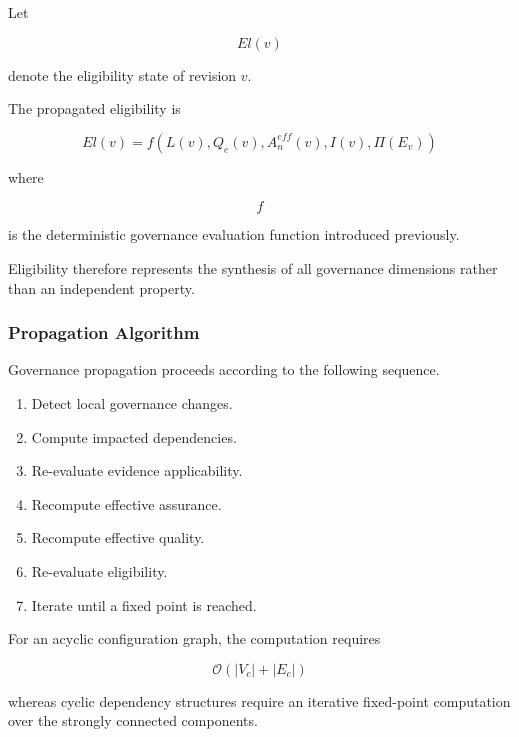 \documentclass[10pt]{article}
\begin{document}
Let

\[
El(v)
\]

denote the eligibility state of revision
$v$.

The propagated eligibility is

\begin{equation}
El(v)
=
f
\left(
L(v),
Q_e(v),
A_n^{eff}(v),
I(v),
\Pi(E_v)
\right)
\label{eq:eligibility_propagation}
\end{equation}

where

\[
f
\]

is the deterministic governance evaluation function introduced previously.

Eligibility therefore represents the synthesis of all governance dimensions
rather than an independent property.

\subsubsection{Propagation Algorithm}

Governance propagation proceeds according to the following sequence.

\begin{enumerate}
    \item Detect local governance changes.
    \item Compute impacted dependencies.
    \item Re-evaluate evidence applicability.
    \item Recompute effective assurance.
    \item Recompute effective quality.
    \item Re-evaluate eligibility.
    \item Iterate until a fixed point is reached.
\end{enumerate}

For an acyclic configuration graph, the computation requires

\begin{equation}
\mathcal{O}
\left(
|V_c|+|E_c|
\right)
\label{eq:propagation_complexity}
\end{equation}

whereas cyclic dependency structures require an iterative fixed-point
computation over the strongly connected components.

\end{document}
